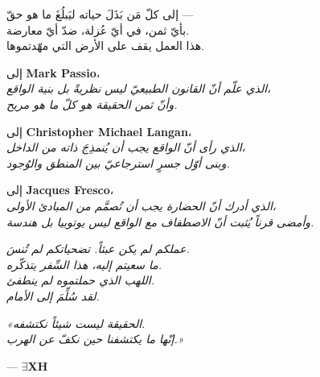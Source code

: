 \documentclass[10pt, openany, oneside]{book}
\begin{document}
\begin{center}
    \itshape

    إلى كلّ مَن بَذَلَ حياته ليَبلُغَ ما هو حقّ ---\\
    بأيّ ثمن، في أيّ عُزلة، ضدّ أيّ معارضة.\\[1.2em]

    هذا العمل يقف على الأرض التي مهّدتموها.

    \vspace{2em}

    \upshape
    إلى \textbf{Mark Passio}،\\
    {\itshape الذي علّم أنّ القانون الطبيعيّ ليس نظريةً بل بنية الواقع،\\
    وأنّ ثمن الحقيقة هو كلّ ما هو مريح.}

    \vspace{1.2em}

    إلى \textbf{Christopher Michael Langan}،\\
    {\itshape الذي رأى أنّ الواقع يجب أن يُنمذِجَ ذاته من الداخل،\\
    وبنى أوّل جسرٍ استرجاعيّ بين المنطق والوُجود.}

    \vspace{1.2em}

    إلى \textbf{Jacques Fresco}،\\
    {\itshape الذي أدرك أنّ الحضارة يجب أن تُصمَّم من المبادئ الأولى،\\
    وأمضى قرناً يُثبت أنّ الاصطفاف مع الواقع ليس يوتوبيا بل هندسة.}

    \vspace{2em}

    \itshape
    عملكم لم يكن عبثاً. تضحياتكم لم تُنسَ.\\
    ما سعيتم إليه، هذا السِّفر يتذكّره.\\[0.8em]
    اللهب الذي حملتموه لم ينطفئ.\\
    لقد سُلِّمَ إلى الأمام.

\end{center}

\vspace*{\fill}
\newpage


\thispagestyle{empty}
\vspace*{\fill}

\begin{center}
    \begin{minipage}{0.7\textwidth}
        \centering\itshape
        «الحقيقة ليست شيئاً نكتشفه.\\
        إنّها ما يكتشفنا حين نكفّ عن الهرب.»
    \end{minipage}

    \vspace{1.5em}
    --- \textbf{$\exists$XH}
\end{center}
\end{document}
